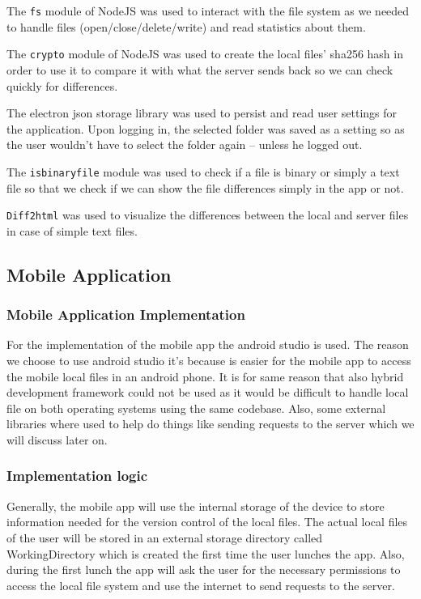 \documentclass[11pt]{article}
\begin{document}
The {\tt fs} module \cite{fs:19} of NodeJS was used to interact with the file system as we needed to handle files (open/close/delete/write) and read statistics about them.

The {\tt crypto} module \cite{crypto:19} of NodeJS was used to create the local files’ sha256 hash in order to use it to compare it with what the server sends back so we can check quickly for differences.

The electron json storage library \cite{electron-json-storage:19} was used to persist and read user settings for the application. Upon logging in, the selected folder was saved as a setting so as the user wouldn’t have to select the folder again – unless he logged out.

The {\tt isbinaryfile} module \cite{isbinaryfile:19} was used to check if a file is binary or simply a text file so that we check if we can show the file differences simply in the app or not.

{\tt Diff2html} \cite{diff2html:19} was used to visualize the differences between the local and server files in case of simple text files.

\subsection{Mobile Application}

\subsubsection*{Mobile Application Implementation}

For the implementation of the mobile app the android studio \cite{androidstudio:19} is used. The reason we choose to use android studio it’s because is easier for the mobile app to access the mobile local files in an android phone. It is for same reason that also hybrid development framework could not be used as it would be difficult to handle local file on both operating systems using the same codebase. Also, some external libraries where used to help do things like sending requests to the server which we will discuss later on.

\subsubsection*{Implementation logic}

Generally, the mobile app will use the internal storage of the device to store information needed for the version control of the local files. The actual local files of the user will be stored in an external storage directory called WorkingDirectory which is created the first time the user lunches the app. Also, during the first lunch the app will ask the user for the necessary permissions to access the local file system and use the internet to send requests to the server.
\end{document}
